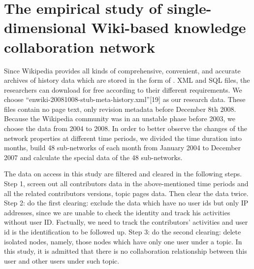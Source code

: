 \documentclass{elsarticle}
\begin{document}
\section{The empirical study of single-dimensional Wiki-based knowledge collaboration network}
\label{sec:empir-study-single}

Since Wikipedia provides all kinds of comprehensive, convenient, and accurate archives of history data which are stored in the form of . XML and SQL files, the researchers can download for free according to their different requirements. We choose “enwiki-20081008-stub-meta-history.xml”[19] as our research data. These files contain no page text, only revision metadata before December 8th 2008. Because the Wikipedia community was in an unstable phase before 2003, we choose the data from 2004 to 2008. In order to better observe the changes of the network properties at different time periods, we divided the time duration into months, build 48 sub-networks of each month from January 2004 to December 2007 and calculate the special data of the 48 sub-networks.

The data on access in this study are filtered and cleared in the following steps. Step 1, screen out all contributors data in the above-mentioned time periods and all the related contributors versions, topic pages data. Then clear the data twice. Step 2: do the first clearing: exclude the data which have no user ids but only IP addresses, since we are unable to check the identity and track his activities without user ID. Factually, we need to track the contributors’ activities and user id is the identification to be followed up. Step 3: do the second clearing: delete isolated nodes, namely, those nodes which have only one user under a topic. In this study, it is admitted that there is no collaboration relationship between this user and other users under such topic.
\end{document}
